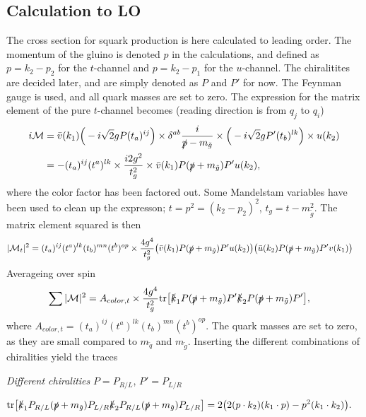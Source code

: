 \documentclass[twoside,english]{uiofysmaster}
\begin{document}
\subsection{Calculation to LO}

The cross section for squark production is here calculated to leading order. The momentum of the gluino is denoted $p$ in the calculations, and defined as $p= k_2-p_2 $ for the $t$-channel and $p=k_2-p_1$ for the $u$-channel. The chiralitites are decided later, and are simply denoted as $P$ and $P'$ for now. The Feynman gauge is used, and all quark masses are set to zero. The expression for the matrix element of the pure $t$-channel becomes (reading direction is from $q_j$ to $q_i$)
\begin{align*}
i \mathcal{M} &= \bar{v} (k_1) \Big( -i \sqrt{2} g P (t_a)^{ij}\Big) \times \delta^{ab} \frac{i}{\slashed{p} - m_{\tilde{g}}} \times \Big( -i \sqrt{2} gP'(t_b)^{lk} \Big) \times u(k_2)\\
&= - (t_a)^{ij}(t^a)^{lk} \times \frac{i 2 g^2}{t_g^2} \times  \bar{v} (k_1)  P (\slashed{p} + m_{\tilde{g}}) P' u(k_2) ,
\end{align*}
where the color factor has been factored out. Some Mandelstam variables have been used to clean up the expresson; $t= p^2 = (k_2 - p_2)^2$, $t_g = t - m_{\tilde{g}}^2$. The matrix element squared is then
\begin{align*}
|\mathcal{M}_t|^2 &=  (t_a)^{ij} (t^a)^{lk} (t_b)^{mn} (t^b)^{op} \times \frac{4 g^4}{t_g^2}
\big( \bar{v} (k_1)  P (\slashed{p} + m_{\tilde{g}}) P' u(k_2) \big)
\big( \bar{u} (k_2)  P (\slashed{p} + m_{\tilde{g}}) P' v(k_1) \big)
\end{align*}
Averageing over spin
\begin{align*}
\sum |\mathcal{M}|^2 &= A_{color, t} \times \frac{4 g^4}{t_g^2} \text{tr} \big[ 
\slashed{k}_1 P (\slashed{p} + m_{\tilde{g}}) P' \slashed{k}_2 P (\slashed{p} + m_{\tilde{g}}) P' \big],
\end{align*}
where $A_{color, t}= (t_a)^{ij} (t^a)^{lk} (t_b)^{mn} (t^b)^{op}$. The quark masses are set to zero, as they are small compared to $m_{\tilde{q}}$ and $m_{\tilde{g}}$. Inserting the different combinations of chiralities yield the traces
\begin{center}
\textit{Different chiralities }$P=P_{R/L}$, $P'=P_{L/R}$
\end{center}
\begin{align}\label{Eq:: susy hadron : calc chiralities}
\text{tr} \big[ 
\slashed{k}_1 P_{R/L} (\slashed{p} + m_{\tilde{g}}) P_{L/R} \slashed{k}_2 P_{R/L} (\slashed{p} + m_{\tilde{g}}) P_{L/R} \big]
&= 2 \big(
2 (p \cdot k_2) (k_1 \cdot p) - p^2 (k_1 \cdot k_2)\big).
\end{align}
\end{document}
